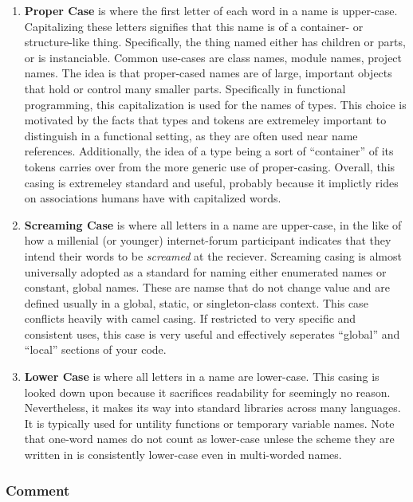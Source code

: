 \documentclass{article}
\begin{document}
	\begin{enumerate}
		\item \textbf{Proper Case} is where the first letter of each word in a name is upper-case. Capitalizing these letters signifies that this name is of a container- or structure-like thing. Specifically, the thing named either has children or parts, or is instanciable. Common use-cases are class names, module names, project names. The idea is that proper-cased names are of large, important objects that hold or control many smaller parts. Specifically in functional programming, this capitalization is used for the names of types. This choice is motivated by the facts that types and tokens are extremeley important to distinguish in a functional setting, as they are often used near name references. Additionally, the idea of a type being a sort of ``container'' of its tokens carries over from the more generic use of proper-casing. Overall, this casing is extremeley standard and useful, probably because it implictly rides on associations humans have with capitalized words.
		
		\item \textbf{Screaming Case} is where all letters in a name are upper-case, in the like of how a millenial (or younger) internet-forum participant indicates that they intend their words to be \textit{screamed} at the reciever. Screaming casing is almost universally adopted as a standard for naming either enumerated names or constant, global names. These are namse that do not change value and are defined usually in a global, static, or singleton-class context. This case conflicts heavily with camel casing. If restricted to very specific and consistent uses, this case is very useful and effectively seperates ``global'' and ``local'' sections of your code.

		\item \textbf{Lower Case} is where all letters in a name are lower-case. This casing is looked down upon because it sacrifices readability for seemingly no reason. Nevertheless, it makes its way into standard libraries across many languages. It is typically used for untility functions or temporary variable names. Note that one-word names do not count as lower-case unlese the scheme they are written in is consistently lower-case even in multi-worded names.
	\end{enumerate}

\subsubsection{Comment}
\end{document}
